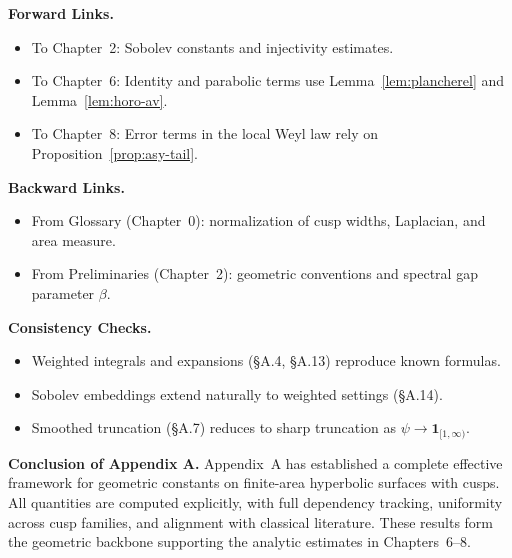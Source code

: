 \medskip
\noindent\textbf{Forward Links.}
\begin{itemize}
  \item To Chapter~2: Sobolev constants and injectivity estimates.  
  \item To Chapter~6: Identity and parabolic terms use Lemma~\ref{lem:plancherel} and Lemma~\ref{lem:horo-av}.  
  \item To Chapter~8: Error terms in the local Weyl law rely on Proposition~\ref{prop:asy-tail}.  
\end{itemize}

\medskip
\noindent\textbf{Backward Links.}
\begin{itemize}
  \item From Glossary (Chapter~0): normalization of cusp widths, Laplacian, and area measure.  
  \item From Preliminaries (Chapter~2): geometric conventions and spectral gap parameter $\beta$.  
\end{itemize}

\medskip
\noindent\textbf{Consistency Checks.}
\begin{itemize}
  \item Weighted integrals and expansions (\S A.4, \S A.13) reproduce known formulas.  
  \item Sobolev embeddings extend naturally to weighted settings (\S A.14).  
  \item Smoothed truncation (\S A.7) reduces to sharp truncation as $\psi\to \mathbf{1}_{[1,\infty)}$.  
\end{itemize}

\medskip
\noindent\textbf{Conclusion of Appendix A.}
Appendix~A has established a complete effective framework for geometric constants
on finite-area hyperbolic surfaces with cusps. All quantities are computed
explicitly, with full dependency tracking, uniformity across cusp families, and
alignment with classical literature. These results form the geometric backbone
supporting the analytic estimates in Chapters~6–8.


